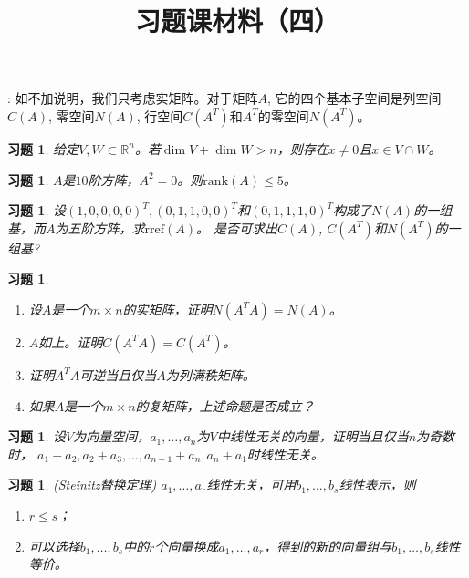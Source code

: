 \documentclass[UTF8]{ctexart}
\newcommand{\rref}{\mathrm{rref}}
\newcommand{\rank}{{\mathrm{rank}}}
\newtheorem{ex}[thm]{习题}
\begin{document}
\title{习题课材料（四）}

\date{}

\maketitle

\vspace{-1cm}





\medskip

: 如不加说明，我们只考虑实矩阵。对于矩阵$A$, 它的四个基本子空间是列空间$C(A)$, 零空间$N(A)$, 行空间$C(A^T)$和$A^T$的零空间$N(A^T)$。
\medskip

\begin{ex}
		给定$V,W\subset \mathbb{R}^n$。若$\dim V+\dim W>n$，则存在$x\ne0$且$x\in V\cap W$。
\end{ex}



\begin{ex}
		$A$是$10$阶方阵，$A^2=0$。则$\rank(A)\le5$。
\end{ex}

\begin{ex}
设$(1,0,0,0,0)^T,(0,1,1,0,0)^T$和$(0,1,1,1,0)^T$构成了$N(A)$的一组基，而$A$为五阶方阵，求$\rref(A)$。 是否可求出$C(A)$, $C(A^T)$和$N(A^T)$的一组基?
\end{ex}

\begin{ex}
\begin{enumerate}
\item 设$A$是一个$m\times n$的实矩阵，证明$N(A^TA) = N(A)$。
\item $A$如上。证明$C(A^TA ) = C(A^T)$。
\item 证明$A^TA$可逆当且仅当$A$为列满秩矩阵。
\item 如果$A$是一个$m\times n$的复矩阵，上述命题是否成立？
\end{enumerate}
\end{ex}

\begin{ex}
		设$V$为向量空间，$a_1,\dots,a_n$为$V$中线性无关的向量，证明当且仅当$n$为奇数时，
	$a_1+a_2,a_2+a_3,\dots,a_{n-1}+a_n,a_n+a_1$时线性无关。
\end{ex}



\begin{ex}
	(Steinitz替换定理)
	$a_1,\dots,a_r$线性无关，可用$b_1,\dots,b_s$线性表示，则
	\begin{enumerate}
		\item $r\le s$；
		\item 可以选择$b_1,\dots,b_s$中的$r$个向量换成$a_1,\dots,a_r$，得到的新的向量组与$b_1,\dots,b_s$线性等价。
	\end{enumerate}
\end{ex}
\end{document}
